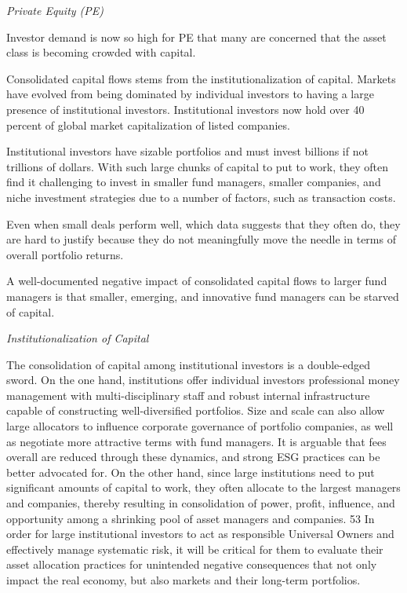 \documentclass[
]{book}
\begin{document}
\emph{Private Equity (PE)}

Investor demand is now so high for PE that many are concerned that the asset class is becoming crowded with capital.

Consolidated capital flows stems from the institutionalization of capital.
Markets have evolved from being dominated by individual investors to
having a large presence of institutional investors.
Institutional investors now hold over 40 percent of
global market capitalization of listed companies.

Institutional investors have sizable portfolios and must invest billions
if not trillions of dollars.
With such large chunks of capital to put to work,
they often find it challenging to invest in smaller fund managers,
smaller companies, and niche investment strategies due to a number of factors,
such as transaction costs.

Even when small deals perform well, which data suggests that they often do,
they are hard to justify because they do not meaningfully move the needle
in terms of overall portfolio returns.

A well-documented negative impact of consolidated capital flows to larger
fund managers is that
smaller, emerging, and innovative fund managers can be starved of capital.

\emph{Institutionalization of Capital}

The consolidation of capital among institutional investors is a double-edged sword. On the one hand,
institutions offer individual investors professional money management with multi-disciplinary staff and
robust internal infrastructure capable of constructing well-diversified portfolios. Size and scale can also allow
large allocators to influence corporate governance of portfolio companies, as well as negotiate more
attractive terms with fund managers. It is arguable that fees overall are reduced through these dynamics, and
strong ESG practices can be better advocated for. On the other hand, since large institutions need to put
significant amounts of capital to work, they often allocate to the largest managers and companies, thereby
resulting in consolidation of power, profit, influence, and opportunity among a shrinking pool of asset
managers and companies. 53 In order for large institutional investors to act as responsible Universal Owners
and effectively manage systematic risk, it will be critical for them to evaluate their asset allocation practices
for unintended negative consequences that not only impact the real economy, but also markets and their
long-term portfolios.
\end{document}
